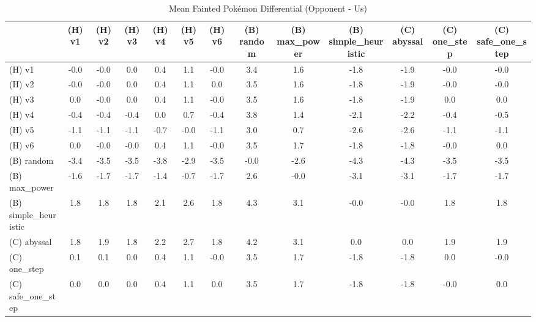 \begin{table}[htbp]
\caption{Mean Fainted Pokémon Differential (Opponent - Us)}
\label{tab:fainted_diff}
\begin{tabular}{lcccccccccccc}
\hline
 & (H) v1 & (H) v2 & (H) v3 & (H) v4 & (H) v5 & (H) v6 & (B) random & (B) max\_power & (B) simple\_heuristic & (C) abyssal & (C) one\_step & (C) safe\_one\_step \\
\hline
(H) v1 & -0.0 & -0.0 & 0.0 & 0.4 & 1.1 & -0.0 & 3.4 & 1.6 & -1.8 & -1.9 & -0.0 & -0.0 \\
(H) v2 & -0.0 & -0.0 & 0.0 & 0.4 & 1.1 & 0.0 & 3.5 & 1.6 & -1.8 & -1.9 & -0.0 & -0.0 \\
(H) v3 & 0.0 & -0.0 & 0.0 & 0.4 & 1.1 & -0.0 & 3.5 & 1.6 & -1.8 & -1.9 & 0.0 & 0.0 \\
(H) v4 & -0.4 & -0.4 & -0.4 & 0.0 & 0.7 & -0.4 & 3.8 & 1.4 & -2.1 & -2.2 & -0.4 & -0.5 \\
(H) v5 & -1.1 & -1.1 & -1.1 & -0.7 & -0.0 & -1.1 & 3.0 & 0.7 & -2.6 & -2.6 & -1.1 & -1.1 \\
(H) v6 & 0.0 & -0.0 & -0.0 & 0.4 & 1.1 & -0.0 & 3.5 & 1.7 & -1.8 & -1.8 & -0.0 & 0.0 \\
(B) random & -3.4 & -3.5 & -3.5 & -3.8 & -2.9 & -3.5 & -0.0 & -2.6 & -4.3 & -4.3 & -3.5 & -3.5 \\
(B) max\_power & -1.6 & -1.7 & -1.7 & -1.4 & -0.7 & -1.7 & 2.6 & -0.0 & -3.1 & -3.1 & -1.7 & -1.7 \\
(B) simple\_heuristic & 1.8 & 1.8 & 1.8 & 2.1 & 2.6 & 1.8 & 4.3 & 3.1 & -0.0 & -0.0 & 1.8 & 1.8 \\
(C) abyssal & 1.8 & 1.9 & 1.8 & 2.2 & 2.7 & 1.8 & 4.2 & 3.1 & 0.0 & 0.0 & 1.9 & 1.9 \\
(C) one\_step & 0.1 & 0.1 & 0.0 & 0.4 & 1.1 & -0.0 & 3.5 & 1.7 & -1.8 & -1.8 & 0.0 & -0.0 \\
(C) safe\_one\_step & 0.0 & 0.0 & 0.0 & 0.4 & 1.1 & 0.0 & 3.5 & 1.7 & -1.8 & -1.8 & -0.0 & 0.0 \\
\hline
\end{tabular}
\end{table}
